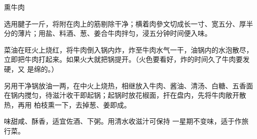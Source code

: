 \begin{recipe}{熏牛肉}

\ingredients


\preparation

\step 选用腱子一斤，将附在肉上的筋剔除干净；横着肉參文切成长一寸、宽五分、厚半
分的薄片；用盐、料酒、葱、姜合牛肉拌匀，浸五分钟时间便入味。

\step 菜油在旺火上烧红，将牛肉倒入锅内炸，炸至牛肉水气一干，油锅内的水泡散尽，
立即把牛肉打起来。如果火大就把锅提开。（火色要看好，炸的时间久了牛肉要发硬，又
是绵的。）

\step 另用干净锅放油一两，在中火上烧热，相继放入牛肉、酱油、清汤、白糖、五香面
在锅内搅匀，待滋汁收干即起锅；起锅时放花椒面，扞在盘内，先将牛肉敞开散热，再用
柏枝熏一下，去掉葱、姜即成。

\features

味甜咸、酥香，适宜佐酒、下粥。用清水收滋汁可保持 一星期不变味，适于作旅行菜。

\end{recipe}

